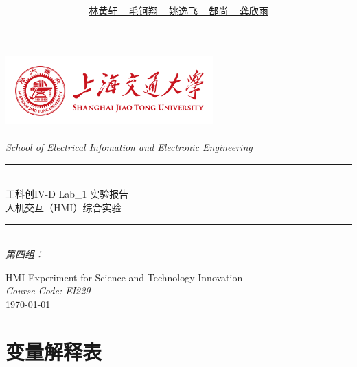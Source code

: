 \documentclass[12pt]{article}
\title{ 
	}
\author{\textup{\underline{林黄轩 ~ 毛钶翔 ~ 姚逸飞 ~ 郜尚 ~ 龚欣雨}}}
\begin{document}
\begin{titlepage}
	\newcommand{\HRule}{\rule{\linewidth}{0.5mm}}
	\includegraphics[width=8cm]{title/logo.png}\\[1.3cm] 
	\center 
	\quad\\[1.5cm]
	\textsl{\large School of Electrical Infomation and Electronic Engineering}\\[0.5cm] 
	\makeatletter
	\HRule \\[0.4cm]
	{ \huge \kaishu
	工科创IV-D Lab\_1 实验报告 \\ \Large 人机交互（HMI）综合实验 \@title}\\[0.4cm] 
	\HRule \\[1.5cm]


	\emph{第四组：} \@author
	
	
	
	\makeatother
	{\large  HMI Experiment for Science and Technology Innovation}\\[0.5cm]
	{\large \emph{Course Code: EI229}}\\[0.5cm]
	{\large \today}\\[2cm] 
	\vfill 
\end{titlepage}

\tableofcontents
\newpage

\section*{变量解释表}
\end{document}
